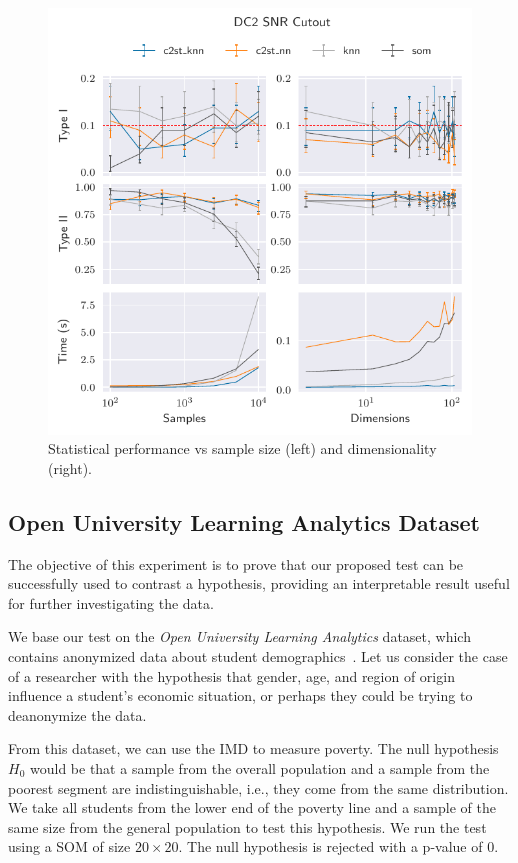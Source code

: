 \begin{figure}[htbp]
    \centering
    \includegraphics{images/6_som/dc2_snr}
    \caption[Statistical performance vs sample size and dimensionality.]{
    Statistical performance vs sample size (left) and dimensionality (right).}
    \label{fig:dc2_snr}
\end{figure}

\subsection{Open University Learning Analytics Dataset}
\label{subsec:som_oulad}
The objective of this experiment is to prove that our proposed test can be successfully
used to contrast a hypothesis, providing an interpretable result useful for further
investigating the data.

We base our test on the \emph{Open University Learning Analytics}
dataset, which contains anonymized data about student demographics~\cite{kuzilek_open_2017}.
Let us consider the case of a researcher with the hypothesis that gender, age, and
region of origin influence a student's economic situation, or perhaps they could
be trying to deanonymize the data.

From this dataset, we can use the \gls{IMD} to measure poverty.
The null hypothesis $H_0$ would be that a sample from the overall population and a sample from
the poorest segment are indistinguishable, i.e., they come from the same distribution.
We take all students from the lower end of the poverty line and a sample of the same size
from the general population to test this hypothesis. We run the test using a \gls{SOM}  of size
$20\times20$. The null hypothesis is rejected with a p-value of $0$.

